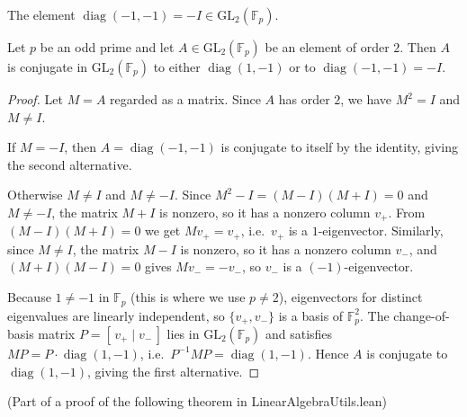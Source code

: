 \begin{definition}
  \label{def:gl2-diag-neg-one-neg-one}
  \leanok
  The element $\operatorname{diag}(-1, -1) = -I \in \mathrm{GL}_2(\mathbb{F}_p)$.
\end{definition}

\begin{theorem}
  \label{thm:gl2-order-two-classification}
  \leanok
  Let $p$ be an odd prime and let $A \in \mathrm{GL}_2(\mathbb{F}_p)$ be an element of order $2$.
  Then $A$ is conjugate in $\mathrm{GL}_2(\mathbb{F}_p)$ to either $\operatorname{diag}(1, -1)$ or to
  $\operatorname{diag}(-1, -1) = -I$.
\end{theorem}

\begin{proof}
  Let $M = A$ regarded as a matrix. Since $A$ has order $2$, we have $M^2 = I$ and $M \neq I$.

  If $M = -I$, then $A = \operatorname{diag}(-1, -1)$ is conjugate to itself by the identity, giving the second alternative.

  Otherwise $M \neq I$ and $M \neq -I$. Since $M^2 - I = (M - I)(M + I) = 0$ and $M \neq -I$, the matrix
  $M + I$ is nonzero, so it has a nonzero column $v_+$. From $(M - I)(M + I) = 0$ we get
  $M v_+ = v_+$, i.e.\ $v_+$ is a $1$-eigenvector. Similarly, since $M \neq I$, the matrix $M - I$ is
  nonzero, so it has a nonzero column $v_-$, and $(M + I)(M - I) = 0$ gives $M v_- = -v_-$, so $v_-$
  is a $(-1)$-eigenvector.

  Because $1 \neq -1$ in $\mathbb{F}_p$ (this is where we use $p \neq 2$), eigenvectors for distinct
  eigenvalues are linearly independent, so $\{v_+, v_-\}$ is a basis of $\mathbb{F}_p^2$. The change-of-basis
  matrix $P = [\,v_+ \mid v_-\,]$ lies in $\mathrm{GL}_2(\mathbb{F}_p)$ and satisfies
  $M P = P \cdot \operatorname{diag}(1, -1)$, i.e.\ $P^{-1} M P = \operatorname{diag}(1, -1)$. Hence
  $A$ is conjugate to $\operatorname{diag}(1, -1)$, giving the first alternative.
\end{proof}




(Part of a proof of the following theorem in LinearAlgebraUtils.lean)

